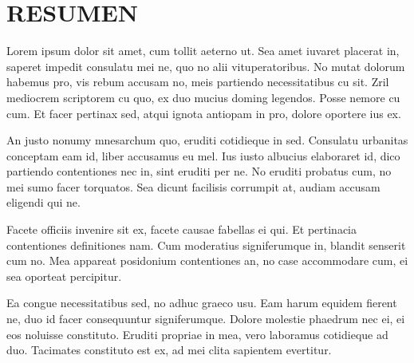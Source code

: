 \chapter*{\Large RESUMEN}
Lorem ipsum dolor sit amet, cum tollit aeterno ut. Sea amet iuvaret placerat in, saperet impedit consulatu mei ne, quo no alii vituperatoribus. No mutat dolorum habemus pro, vis rebum accusam no, meis partiendo necessitatibus cu sit. Zril mediocrem scriptorem cu quo, ex duo mucius doming legendos. Posse nemore cu cum. Et facer pertinax sed, atqui ignota antiopam in pro, dolore oportere ius ex.

An justo nonumy mnesarchum quo, eruditi cotidieque in sed. Consulatu urbanitas conceptam eam id, liber accusamus eu mel. Ius iusto albucius elaboraret id, dico partiendo contentiones nec in, sint eruditi per ne. No eruditi probatus cum, no mei sumo facer torquatos. Sea dicunt facilisis corrumpit at, audiam accusam eligendi qui ne.

Facete officiis invenire sit ex, facete causae fabellas ei qui. Et pertinacia contentiones definitiones nam. Cum moderatius signiferumque in, blandit senserit cum no. Mea appareat posidonium contentiones an, no case accommodare cum, ei sea oporteat percipitur.

Ea congue necessitatibus sed, no adhuc graeco usu. Eam harum equidem fierent ne, duo id facer consequuntur signiferumque. Dolore molestie phaedrum nec ei, ei eos noluisse constituto. Eruditi propriae in mea, vero laboramus cotidieque ad duo. Tacimates constituto est ex, ad mei clita sapientem evertitur.
